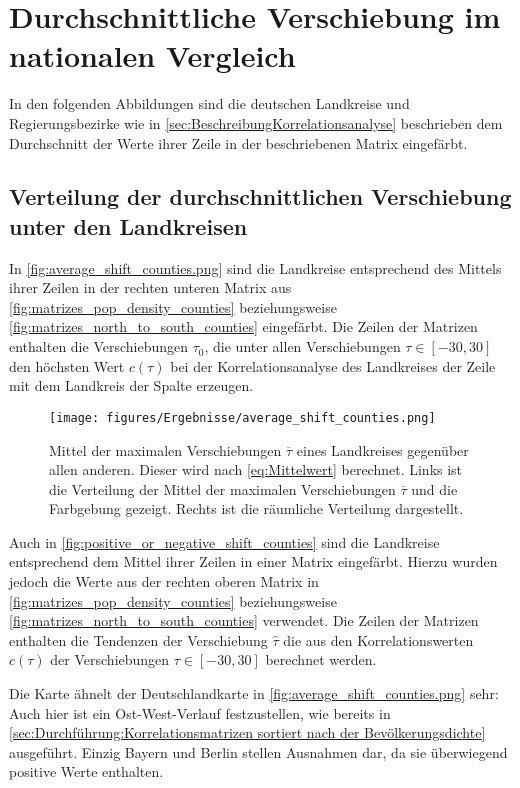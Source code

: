 \section{Durchschnittliche Verschiebung im nationalen Vergleich}
In den folgenden Abbildungen sind die deutschen Landkreise und Regierungsbezirke wie in \autoref{sec:BeschreibungKorrelationsanalyse} beschrieben dem Durchschnitt der Werte ihrer Zeile in der beschriebenen Matrix eingefärbt.
\subsection{Verteilung der durchschnittlichen Verschiebung unter den Landkreisen}\label{sec:Durchführung:Verteilung der durchschnittlichen Verschiebung unter den Landkreise}
In \autoref{fig:average_shift_counties.png} sind die Landkreise entsprechend des Mittels ihrer Zeilen in der rechten unteren Matrix aus \autoref{fig:matrizes_pop_density_counties} beziehungsweise \autoref{fig:matrizes_north_to_south_counties} eingefärbt. Die Zeilen der Matrizen enthalten die Verschiebungen $\tau_0$, die unter allen Verschiebungen $\tau\in [-30,30]$ den höchsten Wert $c(\tau)$ bei der Korrelationsanalyse des Landkreises der Zeile mit dem Landkreis der Spalte erzeugen.

\begin{figure}[H]
    \centering
    \texttt{[image: figures/Ergebnisse/average\_shift\_counties.png]}
    \caption{Mittel der maximalen Verschiebungen $\overline{\tau}$ eines Landkreises gegenüber allen anderen. Dieser wird nach \autoref{eq:Mittelwert} berechnet. Links ist die Verteilung der Mittel der maximalen Verschiebungen $\overline{\tau}$ und die Farbgebung gezeigt. Rechts ist die räumliche Verteilung dargestellt.}
    \label{fig:average_shift_counties.png}
\end{figure}
\newpage
Auch in \autoref{fig:positive_or_negative_shift_counties} sind die Landkreise entsprechend dem Mittel ihrer Zeilen in einer Matrix eingefärbt. Hierzu wurden jedoch die Werte aus der rechten oberen Matrix in \autoref{fig:matrizes_pop_density_counties} beziehungsweise \autoref{fig:matrizes_north_to_south_counties} verwendet. Die Zeilen der Matrizen enthalten die Tendenzen der Verschiebung $\hat{\tau}$ die aus den Korrelationswerten $c(\tau)$ der Verschiebungen $\tau\in [-30,30]$ berechnet werden.

Die Karte ähnelt der Deutschlandkarte in \autoref{fig:average_shift_counties.png} sehr:
Auch hier ist ein Ost-West-Verlauf festzustellen, wie bereits in \autoref{sec:Durchführung:Korrelationsmatrizen sortiert nach der Bevölkerungsdichte} ausgeführt. Einzig Bayern und Berlin stellen Ausnahmen dar, da sie überwiegend positive Werte enthalten.

